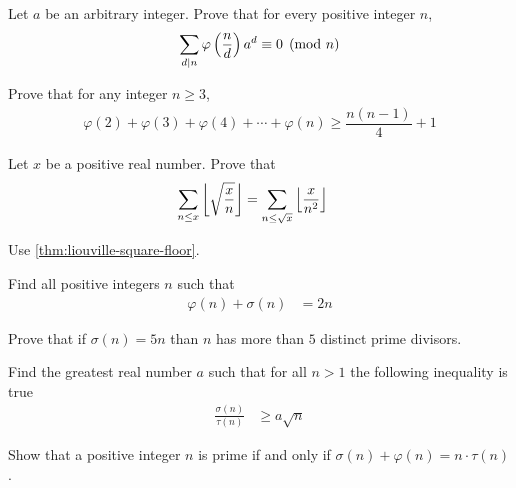 \begin{problem}
	Let $a$ be an arbitrary integer. Prove that for every positive integer $n$,
		\begin{align*}
			\sum_{d \mid n}\varphi\left(\frac{n}{d}\right)a^d\equiv0\pmod{n}
		\end{align*}
\end{problem}

\begin{problem}
	Prove that for any integer $n \geq 3$,
		\begin{align*}
			\varphi(2)+\varphi(3)+\varphi(4)+\cdots+\varphi(n)\ge\dfrac{n(n-1)}{4}+1
		\end{align*}
\end{problem}

\begin{problem}
	Let $x$ be a positive real number. Prove that
		\begin{align*}
			\sum_{n \leq x}\left\lfloor{\sqrt{\frac{x}{n}}}\right\rfloor &= \sum_{n\leq\sqrt x}\left\lfloor{\frac{x}{n^2}}\right\rfloor
		\end{align*}
\end{problem}

\begin{hint}
	Use \autoref{thm:liouville-square-floor}.
\end{hint}

\begin{problem} %
	Find all positive integers $n$ such that
		\begin{align*}
			\varphi(n) + \sigma(n)
				& = 2n
		\end{align*}
\end{problem}

\begin{problem} %
	Prove that if $\sigma(n)=5n$ than $n$ has more than $5$ distinct prime divisors.
\end{problem}

\begin{problem}[Belarus 2010] %
	Find the greatest real number $a$ such that for all $n>1$ the following inequality is true
		\begin{align*}
			\frac{\sigma (n)}{\tau (n)}
				& \geq a\sqrt{n}
		\end{align*}
\end{problem}

\begin{problem} %
	Show that a positive integer $n$ is prime if and only if $\sigma (n)+\varphi (n)=n\cdot\tau (n)$.
\end{problem}

